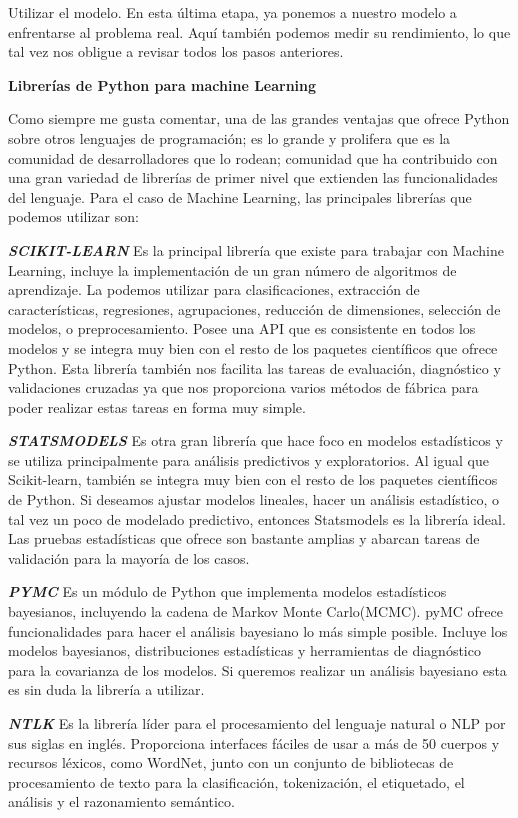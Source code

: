 Utilizar el modelo. En esta última etapa, ya ponemos a nuestro modelo a enfrentarse al problema real. Aquí también podemos medir su rendimiento, lo que tal vez nos obligue a revisar todos los pasos anteriores.

\textbf{Librerías de Python para machine Learning}


Como siempre me gusta comentar, una de las grandes ventajas que ofrece Python sobre otros lenguajes de programación; es lo grande y prolifera que es la comunidad de desarrolladores que lo rodean; comunidad que ha contribuido con una gran variedad de librerías de primer nivel que extienden las funcionalidades del lenguaje. Para el caso de Machine Learning, las principales librerías que podemos utilizar son:

\textbf{\textit{SCIKIT-LEARN}} Es la principal librería que existe para trabajar con Machine Learning, incluye la implementación de un gran número de algoritmos de aprendizaje. La podemos utilizar para clasificaciones, extracción de características, regresiones, agrupaciones, reducción de dimensiones, selección de modelos, o preprocesamiento. Posee una API que es consistente en todos los modelos y se integra muy bien con el resto de los paquetes científicos que ofrece Python. Esta librería también nos facilita las tareas de evaluación, diagnóstico y validaciones cruzadas ya que nos proporciona varios métodos de fábrica para poder realizar estas tareas en forma muy simple.

\textbf{\textit{STATSMODELS}} Es otra gran librería que hace foco en modelos estadísticos y se utiliza principalmente para análisis predictivos y exploratorios. Al igual que Scikit-learn, también se integra muy bien con el resto de los paquetes científicos de Python. Si deseamos ajustar modelos lineales, hacer un análisis estadístico, o tal vez un poco de modelado predictivo, entonces Statsmodels es la librería ideal. Las pruebas estadísticas que ofrece son bastante amplias y abarcan tareas de validación para la mayoría de los casos.

\textbf{\textit{PYMC}} Es un módulo de Python que implementa modelos estadísticos bayesianos, incluyendo la cadena de Markov Monte Carlo(MCMC). pyMC ofrece funcionalidades para hacer el análisis bayesiano lo más simple posible. Incluye los modelos bayesianos, distribuciones estadísticas y herramientas de diagnóstico para la covarianza de los modelos. Si queremos realizar un análisis bayesiano esta es sin duda la librería a utilizar.

\textbf{\textit{NTLK}} Es la librería líder para el procesamiento del lenguaje natural o NLP por sus siglas en inglés. Proporciona interfaces fáciles de usar a más de 50 cuerpos y recursos léxicos, como WordNet, junto con un conjunto de bibliotecas de procesamiento de texto para la clasificación, tokenización, el etiquetado, el análisis y el razonamiento semántico.


